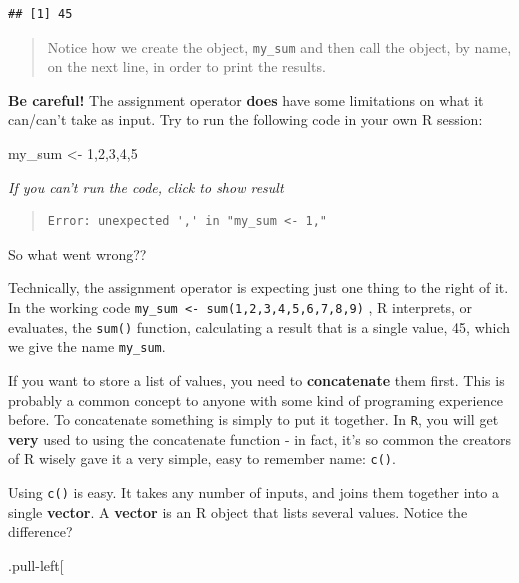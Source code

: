 \documentclass[
]{book}
\newenvironment{Shaded}{\begin{snugshade}}{\end{snugshade}}
\newcommand{\DecValTok}[1]{\textcolor[rgb]{0.00,0.00,0.81}{#1}}
\newcommand{\NormalTok}[1]{#1}
\newcommand{\OtherTok}[1]{\textcolor[rgb]{0.56,0.35,0.01}{#1}}
\begin{document}
\begin{verbatim}
## [1] 45
\end{verbatim}

\begin{quote}
Notice how we create the object, \texttt{my\_sum} and then call the object, by name,
on the next line, in order to print the results.
\end{quote}

\textbf{Be careful!} The assignment operator \textbf{does} have some limitations on what it can/can't take as input. Try to run the following code in your own R session:

\begin{Shaded}
\begin{Highlighting}[]
\NormalTok{my\_sum }\OtherTok{\textless{}{-}} \DecValTok{1}\NormalTok{,}\DecValTok{2}\NormalTok{,}\DecValTok{3}\NormalTok{,}\DecValTok{4}\NormalTok{,}\DecValTok{5}
\end{Highlighting}
\end{Shaded}

\emph{If you can't run the code, click to show result}

\begin{quote}
\begin{verbatim}
Error: unexpected ',' in "my_sum <- 1,"
\end{verbatim}
\end{quote}

So what went wrong??

Technically, the assignment operator is expecting just one thing to the right of it. In the working code \texttt{my\_sum\ \textless{}-\ sum(1,2,3,4,5,6,7,8,9)} , R interprets, or evaluates, the \texttt{sum()} function, calculating a result that is a single value, 45, which we give the name \texttt{my\_sum}.

If you want to store a list of values, you need to \textbf{concatenate} them first. This is probably a common concept to anyone with some kind of programing experience before. To concatenate something is simply to put it together. In \texttt{R}, you will get \textbf{very} used to using the concatenate function - in fact, it's so common the creators of R wisely gave it a very simple, easy to remember name: \texttt{c()}.

Using \texttt{c()} is easy. It takes any number of inputs, and joins them together into a single \textbf{vector}. A \textbf{vector} is an R object that lists several values. Notice the difference?

.pull-left{[}
\end{document}
